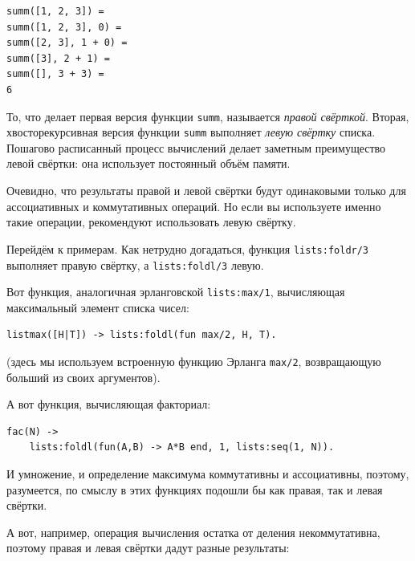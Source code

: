 \documentclass[
  paper=a4,
  fontsize=14pt,
  openany,
  appendixprefix=true
]{scrbook}
\begin{document}
\begin{verbatim}
summ([1, 2, 3]) =
summ([1, 2, 3], 0) =
summ([2, 3], 1 + 0) =
summ([3], 2 + 1) =
summ([], 3 + 3) =
6
\end{verbatim}

То, что делает первая версия функции \lstinline{summ}, называется {\em правой свёрткой}. Вторая, хвосторекурсивная версия функции \lstinline{summ} выполняет {\em левую свёртку} списка. Пошагово расписанный процесс вычислений делает заметным преимущество левой свёртки: она использует постоянный объём памяти.

Очевидно, что результаты правой и левой свёртки будут одинаковыми только для ассоциативных и коммутативных операций. Но если вы используете именно такие операции, рекомендуют использовать левую свёртку.


Перейдём к примерам. Как нетрудно догадаться, функция \lstinline{lists:foldr/3} выполняет правую свёртку, а \lstinline{lists:foldl/3} левую.

Вот функция, аналогичная эрланговской \lstinline{lists:max/1}, вычисляющая максимальный элемент списка чисел:

\begin{lstlisting}
listmax([H|T]) -> lists:foldl(fun max/2, H, T).
\end{lstlisting}

(здесь мы используем встроенную функцию Эрланга \lstinline{max/2}, возвращающую больший из своих аргументов).

А вот функция, вычисляющая факториал:

\begin{lstlisting}
fac(N) ->
    lists:foldl(fun(A,B) -> A*B end, 1, lists:seq(1, N)).
\end{lstlisting}

И умножение, и определение максимума коммутативны и ассоциативны, поэтому, разумеется, по смыслу в этих функциях подошли бы как правая, так и левая свёртки.

А вот, например, операция вычисления остатка от деления некоммутативна, поэтому правая и левая свёртки дадут разные результаты:
\end{document}
